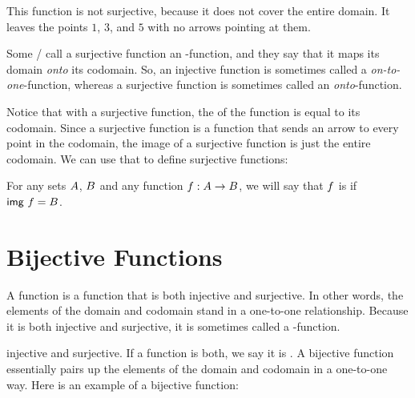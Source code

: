 \documentclass[../../../main.tex]{subfiles}
\begin{document}
This function is not surjective, because it does not cover the entire domain. It leaves the points $1$, $3$, and $5$ with no arrows pointing at them.

\begin{terminology}
  Some \mathers/ call a surjective function an -function, and they say that it maps its domain \emph{onto} its codomain. So, an injective function is sometimes called a \emph{on-to-one}-function, whereas a surjective function is sometimes called an \emph{onto}-function.
\end{terminology}

Notice that with a surjective function, the  of the function is equal to its codomain. Since a surjective function is a function that sends an arrow to every point in the codomain, the image of a surjective function is just the entire codomain. We can use that to define surjective functions:

\begin{fdefinition}
  \label{def:surjective-functions}
  For any sets $A$, $B$ and any function $f: A \rightarrow B$, we will say that $f$ is  if $\mathsf{img}~f = B$. 
\end{fdefinition}


\section{Bijective Functions}

\begin{terminology}
  A  function is a function that is both injective and surjective. In other words, the elements of the domain and codomain stand in a one-to-one relationship. Because it is both injective and surjective, it is sometimes called a -function.
\end{terminology}

 injective and surjective. If a function is both, we say it is . A bijective function essentially pairs up the elements of the domain and codomain in a one-to-one way. Here is an example of a bijective function:
\end{document}
